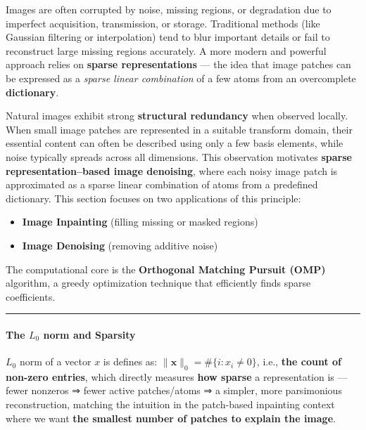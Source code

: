 \documentclass[11pt]{article}
\providecommand{\tightlist}{%
      \setlength{\itemsep}{0pt}\setlength{\parskip}{0pt}}
\begin{document}
Images are often corrupted by noise, missing regions, or degradation due
to imperfect acquisition, transmission, or storage. Traditional methods
(like Gaussian filtering or interpolation) tend to blur important
details or fail to reconstruct large missing regions accurately. A more
modern and powerful approach relies on \textbf{sparse representations}
--- the idea that image patches can be expressed as a \emph{sparse
linear combination} of a few atoms from an overcomplete
\textbf{dictionary}.

Natural images exhibit strong \textbf{structural redundancy} when
observed locally. When small image patches are represented in a suitable
transform domain, their essential content can often be described using
only a few basis elements, while noise typically spreads across all
dimensions. This observation motivates \textbf{sparse
representation--based image denoising}, where each noisy image patch is
approximated as a sparse linear combination of atoms from a predefined
dictionary. This section focuses on two applications of this principle:

\begin{itemize}
\tightlist
\item
  \textbf{Image Inpainting} (filling missing or masked regions)
\item
  \textbf{Image Denoising} (removing additive noise)
\end{itemize}

The computational core is the \textbf{Orthogonal Matching Pursuit (OMP)}
algorithm, a greedy optimization technique that efficiently finds sparse
coefficients.

\begin{center}\rule{0.5\linewidth}{0.5pt}\end{center}

\hypertarget{the-l_0-norm-and-sparsity}{%
\paragraph{\texorpdfstring{\textbf{The \(L_0\) norm and
Sparsity}}{The L\_0 norm and Sparsity}}\label{the-l_0-norm-and-sparsity}}

\(L_0\) norm of a vector \(x\) is defines as:
\(\|\mathbf{x}\|_{0} = \#\{i : x_i \neq 0\}\), i.e., \textbf{the count
of non-zero entries}, which directly measures \textbf{how sparse} a
representation is --- fewer nonzeros ⇒ fewer active patches/atoms ⇒ a
simpler, more parsimonious reconstruction, matching the intuition in the
patch-based inpainting context where we want \textbf{the smallest number
of patches to explain the image}.
\end{document}
